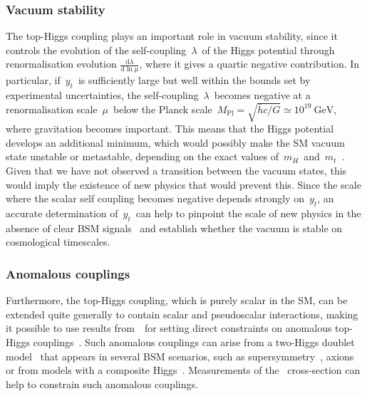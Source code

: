 \subsubsection{Vacuum stability}
The top-Higgs coupling plays an important role in vacuum stability, since it controls the evolution of the self-coupling~$\lambda$~of the Higgs potential through renormalisation evolution $\frac{\mathrm{d}\lambda}{\mathrm{d}\ln{\mu}}$, where it gives a quartic negative contribution. In particular, if~$y_t$~is sufficiently large but well within the bounds set by experimental uncertainties, the self-coupling~$\lambda$~becomes negative at a renormalisation scale~$\mu$~below the Planck scale~$M_{\mathrm{Pl}} = \sqrt{\bar{h}c / G} \simeq 10^{19}~\mathrm{GeV}$, where gravitation becomes important. This means that the Higgs potential develops an additional minimum, which would possibly make the SM vacuum state unstable or metastable, depending on the exact values of~$m_H$~and~$m_t$~\cite{Degrassi:2012ry}. Given that we have not observed a transition between the vacuum states, this would imply the existence of new physics that would prevent this. Since the scale where the scalar self coupling becomes negative depends strongly on~$y_t$, an accurate determination of~$y_t$~can help to pinpoint the scale of new physics in the absence of clear BSM signals~\cite{Bezrukov:2014ina} and establish whether the vacuum is stable on cosmological timescales.

\subsubsection{Anomalous couplings}
Furthermore, the top-Higgs coupling, which is purely scalar in the SM, can be extended quite generally to contain scalar and pseudoscalar interactions, making it possible to use results from~\ttH~for setting direct constraints on anomalous top-Higgs couplings~\cite{Kobakhidze:2016mfx}. Such anomalous couplings can arise from a two-Higgs doublet model~\cite{Lee:1973iz,Branco:2011iw} that appears in several BSM scenarios, such as supersymmetry~\cite{Haber:1984rc}, axions~\cite{Kim:1986ax} or from models with a composite Higgs~\cite{Liu:2017dsz}. Measurements of the \ttH~cross-section can help to constrain such anomalous couplings.

